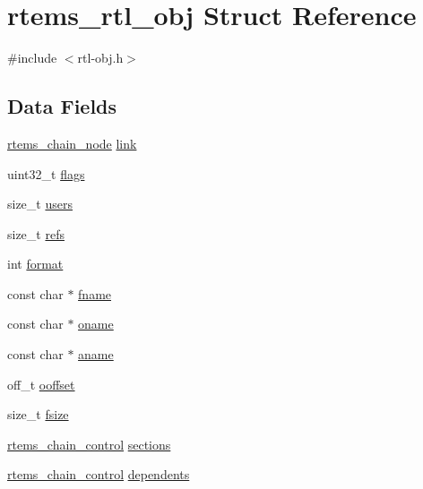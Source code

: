 \hypertarget{structrtems__rtl__obj}{}\section{rtems\+\_\+rtl\+\_\+obj Struct Reference}
\label{structrtems__rtl__obj}


{\ttfamily \#include $<$rtl-\/obj.\+h$>$}

\subsection*{Data Fields}
\begin{DoxyCompactItemize}
\item 
\mbox{\hyperlink{structChain__Node__struct}{rtems\+\_\+chain\+\_\+node}} \mbox{\hyperlink{structrtems__rtl__obj_a1b7fdee523975216a98e3dd0602adccd}{link}}
\item 
uint32\+\_\+t \mbox{\hyperlink{structrtems__rtl__obj_a77e630dbe9962b681d5b377f5197b135}{flags}}
\item 
size\+\_\+t \mbox{\hyperlink{structrtems__rtl__obj_a646ffe9df749ea146afb626057d3ac96}{users}}
\item 
size\+\_\+t \mbox{\hyperlink{structrtems__rtl__obj_ade6e2b1bb536566e5c999bfdff3a5a5b}{refs}}
\item 
int \mbox{\hyperlink{structrtems__rtl__obj_a88fc442d22e995eb7333404f207352d1}{format}}
\item 
const char $\ast$ \mbox{\hyperlink{structrtems__rtl__obj_a174727d46aa55539e3575f27411107f8}{fname}}
\item 
const char $\ast$ \mbox{\hyperlink{structrtems__rtl__obj_ae9004bd443b407a4f8ab860f09bc9c0f}{oname}}
\item 
const char $\ast$ \mbox{\hyperlink{structrtems__rtl__obj_af5800ef21318935014e24523aab3f383}{aname}}
\item 
off\+\_\+t \mbox{\hyperlink{structrtems__rtl__obj_a0cfc79e26d28fd07e391da865e50b5db}{ooffset}}
\item 
size\+\_\+t \mbox{\hyperlink{structrtems__rtl__obj_aa629acf6b03949748d307b7debe6efce}{fsize}}
\item 
\mbox{\hyperlink{unionChain__Control}{rtems\+\_\+chain\+\_\+control}} \mbox{\hyperlink{structrtems__rtl__obj_add88613b5efee7985b69c4f6fef76cb8}{sections}}
\item 
\mbox{\hyperlink{unionChain__Control}{rtems\+\_\+chain\+\_\+control}} \mbox{\hyperlink{structrtems__rtl__obj_ac1170912098eb178166235227789a6c3}{dependents}}
\item 

\end{DoxyCompactItemize}
